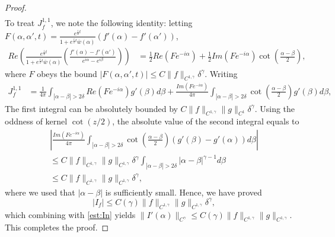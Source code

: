 \documentclass[10pt,a4paper]{amsart}
\newcommand{\ba}{\begin{array}{l}}
\newcommand{\be}{\begin{equation}}
\newcommand{\ea}{\end{array}}
\newcommand{\ee}{\end{equation}}
\begin{document}
\begin{proof}
\begin{align*}
    \end{align*}
    To treat $J_f^{1,1}$, we note the following identity: letting $F(\alpha,\alpha',t) = \frac{e^{\frac{i}{2}t}}{1+ e^{\frac{i}{2}t}\bar{w}(\alpha)}(f'(\alpha) - f'(\alpha'))$,
    \begin{align*}
        Re\left(\frac{e^{\frac{i}{2}t}}{1+ e^{\frac{i}{2}t}\bar{w}(\alpha)}\left(\frac{f'(\alpha) - f'(\alpha')}{e^{i\alpha} - e^{i\beta}}\right)\right) &= \frac12 Re\left(F e^{-i\alpha}\right) + \frac12 Im\left(F e^{-i\alpha}\right)\cot\left(\frac{\alpha - \beta}{2}\right),
    \end{align*}
    where $F$ obeys the bound $|F(\alpha,\alpha',t)| \le C\|f\|_{C^{1,\gamma}} \delta^\gamma$. Writing
    \begin{align*}
        J_{f}^{1,1} &= \frac{1}{4\pi} \int_{|\alpha - \beta| > 2\delta} Re\left(F e^{-i\alpha}\right) g'(\beta) d\beta + \frac{Im\left(F e^{-i\alpha}\right)}{4\pi}\int_{|\alpha - \beta| > 2\delta}\cot\left(\frac{\alpha - \beta}{2}\right)g'(\beta) d\beta,
    \end{align*}
    The first integral can be absolutely bounded by $C\|f\|_{C^{1,\gamma}} \|g\|_{C^1}\delta^\gamma$. Using the oddness of kernel $\cot(z/2)$, the absolute value of the second integral equals to
    \be
    \ba
        \left|\frac{Im\left(F e^{-i\alpha}\right)}{4\pi}\int_{|\alpha - \beta| > 2\delta}\cot\left(\frac{\alpha - \beta}{2}\right)(g'(\beta)-g'(\alpha)) d\beta\right| \\ \le C\|f\|_{C^{1,\gamma}}\|g\|_{C^{1,\gamma}}\delta^\gamma\int_{|\alpha-\beta|>2\delta}|\alpha - \beta|^{\gamma - 1}d\beta\\
        \le C\|f\|_{C^{1,\gamma}}\|g\|_{C^{1,\gamma}}\delta^\gamma,
    \ea
    \ee
    where we used that $|\alpha - \beta|$ is sufficiently small. Hence, we have proved
    \begin{equation}
        \label{est:If}
        |I_f| \le C(\gamma)\|f\|_{C^{1,\gamma}}\|g\|_{C^{1,\gamma}}\delta^\gamma,
    \end{equation}
    which combining with \eqref{est:In} yields $\|I'(\alpha)\|_{C^\gamma} \le C(\gamma)\|f\|_{C^{1,\gamma}}\|g\|_{C^{1,\gamma}}$. This completes the proof.
\end{proof}
\end{document}
